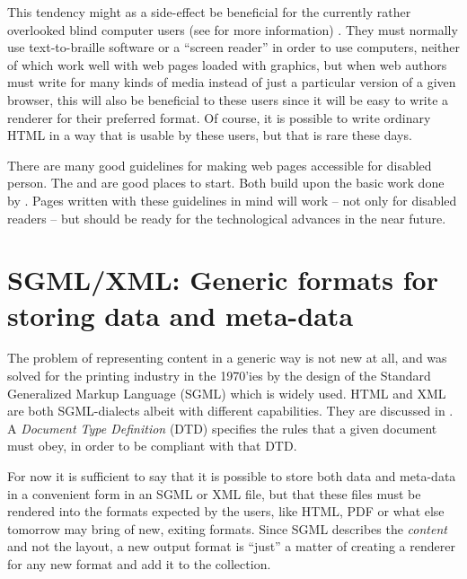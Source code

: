   
This tendency might as a side-effect be beneficial for the currently
rather overlooked blind computer users (see
 for more information) .  They must normally use
text-to-braille software or a ``screen reader'' in order to use
computers, neither of which work well with web pages loaded with
graphics, but when web authors must write for many kinds of media
instead of just a particular version of a given browser, this will
also be beneficial to these users since it will be easy to write a
renderer for their preferred format.  Of course, it is possible to
write ordinary HTML in a way that is usable by these users, but that
is rare these days.

There are many good guidelines for making web pages accessible for
disabled person.  The
 and
 are good places to start.  Both build upon
the basic work done by
.  Pages written with these guidelines in mind will work
-- not only for disabled readers -- but should be ready for the
technological advances in the near future.

\section{SGML/XML:  Generic formats for storing data and meta-data}
\label{sec:sgml-and-xml-generic-formats}

The problem of representing content in a generic way is not
new at all, and was solved for the printing industry in the
1970'ies by the design of the Standard Generalized Markup
Language (SGML) which is widely used.  HTML and XML are both
SGML-dialects albeit with different capabilities.  They are
discussed in .  A
\textit{Document Type Definition} (DTD) specifies the rules
that a given document must obey, in order to be compliant
with that DTD.

For now it is sufficient to say that it is possible to store both data
and meta-data in a convenient form in an SGML or XML file, but that
these files must be rendered into the formats expected by the users,
like HTML, PDF or what else tomorrow may bring of new, exiting
formats.  Since SGML describes the \textit{content} and not the
layout, a new output format is ``just'' a matter of creating a
renderer for any new format and add it to the collection.

